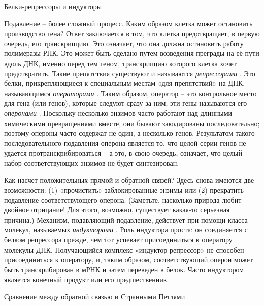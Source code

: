 \documentclass[../main.tex]{subfiles}
\begin{document}
Белки-репрессоры и индукторы

Подавление \--- более сложный процесс. Каким образом клетка может остановить производство гена? Ответ заключается в том, что клетка предотвращает, в первую очередь, его транскрипцию. Это означает, что она должна остановить работу полимеразы РНК\@. Это может быть сделано путем возведения преграды на её пути вдоль ДНК, именно перед тем геном, транскрипцию которого клетка хочет предотвратить. Такие препятствия существуют и называются \emph{репрессорами} . Это белки, прикрепляющиеся к специальным местам «для препятствий» на ДНК, называющимся \emph{операторами} . Таким образом, оператор \--- это контрольное место для гена (или генов), которые следуют сразу за ним; эти гены называются его \emph{оперонами} . Поскольку несколько энзимов часто работают над длинными химическими превращениями вместе, они бывают закодированы последовательно; поэтому опероны часто содержат не один, а несколько генов. Результатом такого последовательного подавления оперона является то, что целой серии генов не удается протранскрибироваться \--- а это, в свою очередь, означает, что целый набор соответствующих энзимов не будет синтезирован.

Как насчет положительных прямой и обратной связей? Здесь снова имеются две возможности: (1) «прочистить» заблокированные энзимы или (2) прекратить подавление соответствующего оперона. (Заметьте, насколько природа любит двойное отрицание! Для этого, возможно, существует какая-то серьезная причина.) Механизм, подавляющий подавление, действует при помощи класса молекул, называемых \emph{индукторами} . Роль индуктора проста: он соединяется с белком репрессора прежде, чем тот успевает присоединиться к оператору молекулы ДНК\@. Получающийся комплекс «индуктор-репрессор» не способен присоединиться к оператору, и, таким образом, соответствующий оперон может быть транскрибирован в мРНК и затем переведен в белок. Часто индуктором является конечный продукт или его предшественник.

Сравнение между обратной связью и Странными Петлями
\end{document}
